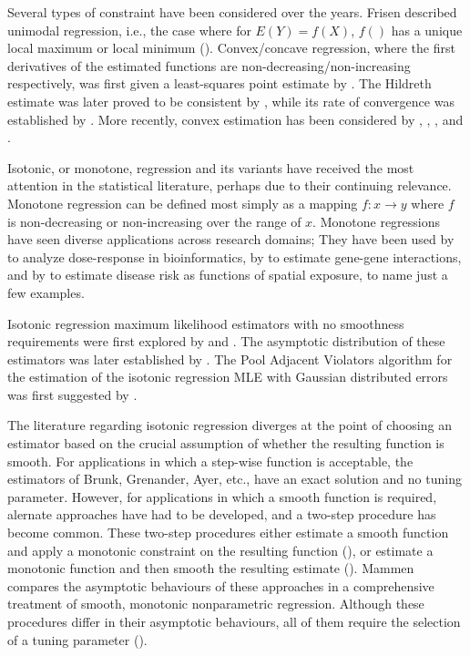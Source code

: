 \documentclass[10pt]{olplainarticle}\usepackage[]{graphicx}\usepackage[]{color}
\begin{document}
Several types of constraint have been considered over the years. Frisen described unimodal regression, i.e., the case where for $E(Y) = f(X)$, $f()$ has a unique local maximum or local minimum (\cite{unimodal}). Convex/concave regression, where the first derivatives of the estimated functions are non-decreasing/non-increasing respectively, was first given a least-squares point estimate by \cite{hildreth}. The Hildreth estimate was later proved to be consistent by \cite{hanson}, while its rate of convergence was established by \cite{mammenconvex}. More recently, convex estimation has been considered by \cite{seijo}, \cite{mazumder}, \cite{kuosmanen}, and \cite{groeneboom}.

Isotonic, or monotone, regression and its variants have received the most attention in the statistical literature, perhaps due to their continuing relevance. Monotone regression can be defined most simply as a mapping $f: x \rightarrow y$ where $f$ is non-decreasing or non-increasing over the range of $x$. Monotone regressions have seen diverse applications across research domains; They have been used by \cite{jianhua} to analyze dose-response in bioinformatics, by \cite{luss} to estimate gene-gene interactions, and by \cite{diggle} to estimate disease risk as functions of spatial exposure, to name just a few examples. 

Isotonic regression maximum likelihood estimators with no smoothness requirements were first explored by \cite{brunk} and \cite{grenander}. The asymptotic distribution of these estimators was later established by \cite{wright}. The Pool Adjacent Violators algorithm for the estimation of the isotonic regression MLE with Gaussian distributed errors was first suggested by \cite{ayer}.

The literature regarding isotonic regression diverges at the point of choosing an estimator based on the crucial assumption of whether the resulting function is smooth. For applications in which a step-wise function is acceptable, the estimators of Brunk, Grenander, Ayer, etc., have an exact solution and no tuning parameter. However, for applications in which a smooth function is required, alernate approaches have had to be developed, and a two-step procedure has become common. These two-step procedures either estimate a smooth function and apply a monotonic constraint on the resulting function (\cite{friedman}), or estimate a monotonic function and then smooth the resulting estimate (\cite{cheng}). Mammen compares the asymptotic behaviours of these approaches in a comprehensive treatment of smooth, monotonic nonparametric regression. Although these procedures differ in their asymptotic behaviours, all of them require the selection of a tuning parameter (\cite{mammen}).
\end{document}
